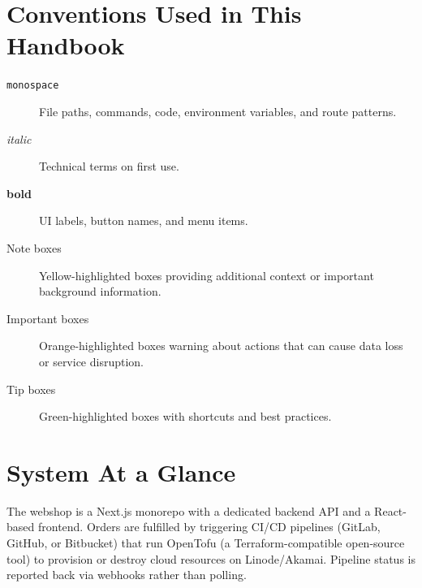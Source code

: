 \documentclass[12pt,a4paper,twoside]{report}
\newcommand{\code}[1]{\texttt{#1}}
\begin{document}
\section{Conventions Used in This Handbook}

\begin{description}
  \item[\code{monospace}] File paths, commands, code, environment variables, and route patterns.
  \item[\textit{italic}] Technical terms on first use.
  \item[\textbf{bold}] UI labels, button names, and menu items.
  \item[Note boxes] Yellow-highlighted boxes providing additional context or important background information.
  \item[Important boxes] Orange-highlighted boxes warning about actions that can cause data loss or service disruption.
  \item[Tip boxes] Green-highlighted boxes with shortcuts and best practices.
\end{description}

\section{System At a Glance}

The webshop is a Next.js monorepo with a dedicated backend API and a
React-based frontend. Orders are fulfilled by triggering CI/CD pipelines
(GitLab, GitHub, or Bitbucket) that run OpenTofu (a
Terraform-compatible open-source tool) to provision or destroy cloud
resources on Linode/Akamai. Pipeline status is reported back via
webhooks rather than polling.
\end{document}
